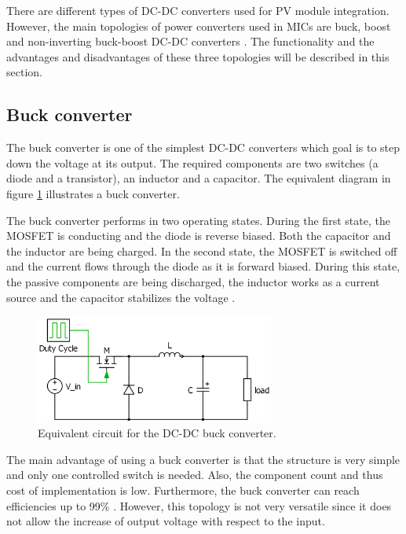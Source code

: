 There are different types of DC-DC converters used for PV module integration. However, the main topologies of power converters used in MICs are buck, boost and non-inverting buck-boost DC-DC converters \cite{advantagebuckboost}. The functionality and the advantages and disadvantages of these three topologies will be described in this section.

\subsection{Buck converter\label{Buck-C}}

The buck converter is one of the simplest DC-DC converters which goal is to step down the voltage at its output. The required components are two switches (a diode and a transistor), an inductor and a capacitor. The equivalent diagram in figure \ref{Buck-converter} illustrates a buck converter.

The buck converter performs in two operating states. 
During the first state, the MOSFET is conducting and the diode is reverse biased. %
Both the capacitor and the inductor are being charged. In the second state, the MOSFET is switched off and the current flows through the diode as it is forward biased. During this state, the passive components are being discharged, the inductor works as a current source and the capacitor stabilizes the voltage \cite{schematicbuckandboost}.

\begin{figure}[H]
	\begin{center}
		\includegraphics[width=0.7\textwidth]{../Pictures/Buck-converter}
		\caption{Equivalent circuit for the DC-DC buck converter.}
		\label{Buck-converter}
	\end{center}	
\end{figure}

The main advantage of using a buck converter is that the structure is very simple and only one controlled  switch is needed. Also, the component count and thus cost of implementation is low. Furthermore, the buck converter can reach efficiencies up to 99\% \cite{Efficiencybuck}. However, this topology is not very versatile since it does not allow the increase of output voltage with respect to the input.

